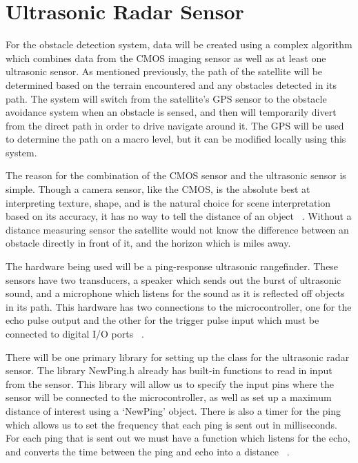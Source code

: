 \documentclass[10pt,letterpaper,onecolumn,journal]{IEEEtran}
\begin{document}
\section{Ultrasonic Radar Sensor}
For the obstacle detection system, data will be created using a complex algorithm which combines data from the CMOS imaging sensor as well as at least one ultrasonic sensor. As mentioned previously, the path of the satellite will be determined based on the terrain encountered and any obstacles detected in its path. The system will switch from the satellite's GPS sensor to the obstacle avoidance system when an obstacle is sensed, and then will temporarily divert from the direct path in order to drive navigate around it. The GPS will be used to determine the path on a macro level, but it can be modified locally using this system.\vspace{.3cm}
\par
The reason for the combination of the CMOS sensor and the ultrasonic sensor is simple. Though a camera sensor, like the CMOS, is the absolute best at interpreting texture, shape, and is the natural choice for scene interpretation based on its accuracy, it has no way to tell the distance of an object ~\cite{santo2016}. Without a distance measuring sensor the satellite would not know the difference between an obstacle directly in front of it, and the horizon which is miles away.\vspace{.3cm}
\par 
The hardware being used will be a ping-response ultrasonic rangefinder. These sensors have two transducers, a speaker which sends out the burst of ultrasonic sound, and a microphone which listens for the sound as it is reflected off objects in its path. This hardware has two connections to the microcontroller, one for the echo pulse output and the other for the trigger pulse input which must be connected to digital I/O ports ~\cite{2016frc}.\vspace{.3cm}
\par 
There will be one primary library for setting up the class for the ultrasonic radar sensor. The library NewPing.h already has built-in functions to read in input from the sensor. This library will allow us to specify the input pins where the sensor will be connected to the microcontroller, as well as set up a maximum distance of interest using a ‘NewPing’ object. There is also a timer for the ping which allows us to set the frequency that each ping is sent out in milliseconds. For each ping that is sent out we must have a function which listens for the echo, and converts the time between the ping and echo into a distance ~\cite{grinberg2013}.\vspace{.3cm}
\end{document}

